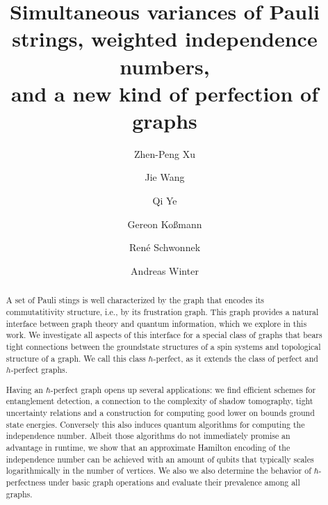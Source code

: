 \documentclass[
12pt,
prx,
aps,
reprint,
a4paper,
longbibliograph,
nofootinbib,
nobibnotes,
superscriptaddress
]{revtex4-2}
\theoremstyle{definition}
\begin{document}
\title{Simultaneous variances of Pauli strings, weighted independence numbers,\protect\\ and a new kind of perfection of graphs}


\author{Zhen-Peng Xu}
\author{Jie Wang}
\author{Qi Ye}

\author{Gereon Ko{\ss}mann}

\author{Ren\'{e} Schwonnek}

\author{Andreas Winter}




\begin{abstract}
A set of Pauli stings is well characterized by the graph that encodes its commutatitivity structure, i.e., by its frustration graph.  
This graph  provides a natural interface between graph theory and quantum information, which we explore in this work.
We investigate all aspects of this interface for a special class of graphs that bears tight connections between the groundstate structures of a spin systems and topological structure of a graph. We call this class $\hbar$-perfect, as it extends the class of  perfect and $h$-perfect graphs.

Having an $\hbar$-perfect graph opens up several applications: we find efficient schemes for entanglement detection, a connection to the complexity of shadow tomography, tight uncertainty relations and a construction for computing good lower on bounds ground state energies.  Conversely this also induces quantum algorithms for computing the independence number. Albeit those algorithms do not immediately promise an advantage in runtime, we show that an approximate Hamilton encoding of the independence number can be achieved with an amount of qubits that typically scales logarithmically in the number of vertices. 
We also we also determine the  behavior of $\hbar$-perfectness under basic graph operations and evaluate their prevalence among all graphs.
\end{abstract}
\end{document}
